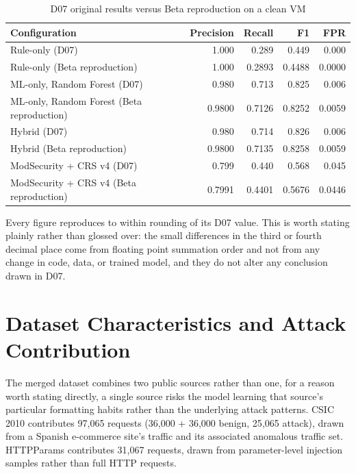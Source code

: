 \documentclass{llncs}
\begin{document}
\begin{table}[h]
\centering
\caption{D07 original results versus Beta reproduction on a clean VM}
\label{tab:reproduce}
\begin{tabular}{lrrrr}
\toprule
\textbf{Configuration} & \textbf{Precision} & \textbf{Recall} & \textbf{F1} & \textbf{FPR} \\
\midrule
Rule-only (D07) & 1.000 & 0.289 & 0.449 & 0.000 \\
Rule-only (Beta reproduction) & 1.000 & 0.2893 & 0.4488 & 0.0000 \\
\addlinespace
ML-only, Random Forest (D07) & 0.980 & 0.713 & 0.825 & 0.006 \\
ML-only, Random Forest (Beta reproduction) & 0.9800 & 0.7126 & 0.8252 & 0.0059 \\
\addlinespace
Hybrid (D07) & 0.980 & 0.714 & 0.826 & 0.006 \\
Hybrid (Beta reproduction) & 0.9800 & 0.7135 & 0.8258 & 0.0059 \\
\addlinespace
ModSecurity + CRS v4 (D07) & 0.799 & 0.440 & 0.568 & 0.045 \\
ModSecurity + CRS v4 (Beta reproduction) & 0.7991 & 0.4401 & 0.5676 & 0.0446 \\
\bottomrule
\end{tabular}
\end{table}

Every figure reproduces to within rounding of its D07 value. This is
worth stating plainly rather than glossed over: the small differences in
the third or fourth decimal place come from floating point summation
order and not from any change in code, data, or trained model, and they
do not alter any conclusion drawn in D07.

\clearpage
\section{Dataset Characteristics and Attack Contribution}
\label{sec:dataset}

The merged dataset combines two public sources rather than one, for a
reason worth stating directly, a single source risks the model learning
that source's particular formatting habits rather than the underlying
attack patterns. CSIC 2010 contributes 97{,}065 requests
(36{,}000 + 36{,}000 benign, 25{,}065 attack), drawn from a
Spanish e-commerce site's traffic and its associated anomalous traffic
set. HTTPParams contributes 31{,}067 requests, drawn from
parameter-level injection samples rather than full HTTP requests.
\end{document}
